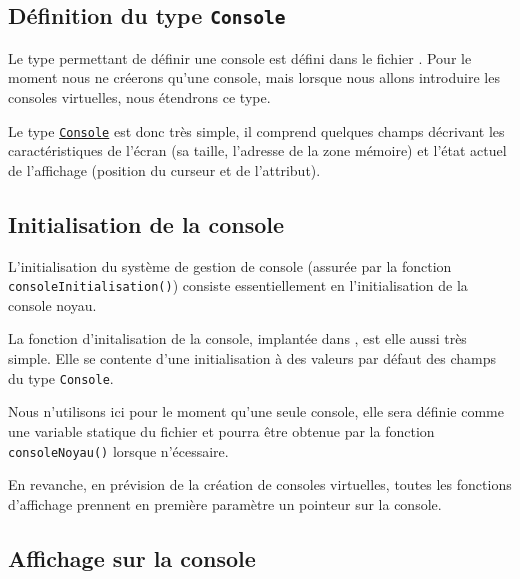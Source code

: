 \subsection{Définition du type {\tt Console}}

   Le type permettant de définir une console est défini dans le fichier
. Pour le moment nous ne créerons
qu'une console, mais lorsque nous allons introduire les consoles
virtuelles, nous étendrons ce type.

   Le type \href{html/console_8h_source.html#l00062}{\tt Console} est
donc très simple, il comprend quelques champs décrivant les
caractéristiques de l'écran (sa taille, l'adresse de la zone mémoire)
et l'état actuel de l'affichage (position du curseur et de
l'attribut).
   
%
\subsection{Initialisation de la console}

   L'initialisation du système de gestion de console (assurée par la
fonction \lstinline!consoleInitialisation()!) consiste essentiellement
en l'initialisation de la console noyau.

   La fonction d'initalisation de la console, implantée dans
, est elle aussi très simple. Elle se
contente d'une initialisation à des valeurs par défaut des champs du
type {\tt Console}.

   Nous n'utilisons ici pour le moment qu'une seule console, elle sera
définie comme une variable statique du fichier
 et pourra être obtenue par la fonction {\tt
  consoleNoyau()} lorsque n'écessaire.

   En revanche, en prévision de la création de consoles virtuelles,
toutes les fonctions d'affichage prennent en première paramètre un
pointeur sur la console.

%
\subsection{Affichage sur la console}


